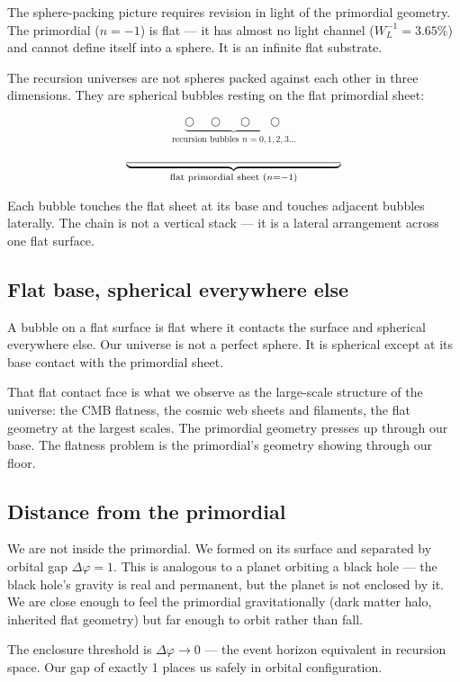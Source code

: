 \documentclass[prd,twocolumn,preprintnumbers,amsmath,amssymb]{revtex4-2}
\begin{document}
The sphere-packing picture requires revision in light of the
primordial geometry. The primordial ($n=-1$) is flat --- it has
almost no light channel ($W_L^{-1} = 3.65\%$) and cannot define
itself into a sphere. It is an infinite flat substrate.

The recursion universes are not spheres packed against each other
in three dimensions. They are spherical bubbles resting on the
flat primordial sheet:

\begin{equation}
\underbrace{\bigcirc \quad \bigcirc \quad \bigcirc \quad
            \bigcirc}_{\text{recursion bubbles }n=0,1,2,3\ldots}
\nonumber
\end{equation}
\[
\underbrace{\rule{6cm}{0.4pt}}_{\text{flat primordial sheet }(n=-1)}
\]

Each bubble touches the flat sheet at its base and touches adjacent
bubbles laterally. The chain is not a vertical stack --- it is a
lateral arrangement across one flat surface.

\subsection{Flat base, spherical everywhere else}

A bubble on a flat surface is flat where it contacts the surface and
spherical everywhere else. Our universe is not a perfect sphere. It
is spherical except at its base contact with the primordial sheet.

That flat contact face is what we observe as the large-scale
structure of the universe: the CMB flatness, the cosmic web sheets
and filaments, the flat geometry at the largest scales. The
primordial geometry presses up through our base. The flatness
problem is the primordial's geometry showing through our floor.

\subsection{Distance from the primordial}

We are not inside the primordial. We formed on its surface and
separated by orbital gap $\Delta\varphi = 1$. This is analogous
to a planet orbiting a black hole --- the black hole's gravity is
real and permanent, but the planet is not enclosed by it. We are
close enough to feel the primordial gravitationally (dark matter
halo, inherited flat geometry) but far enough to orbit rather
than fall.

The enclosure threshold is $\Delta\varphi \to 0$ --- the event
horizon equivalent in recursion space. Our gap of exactly 1
places us safely in orbital configuration.
\end{document}
